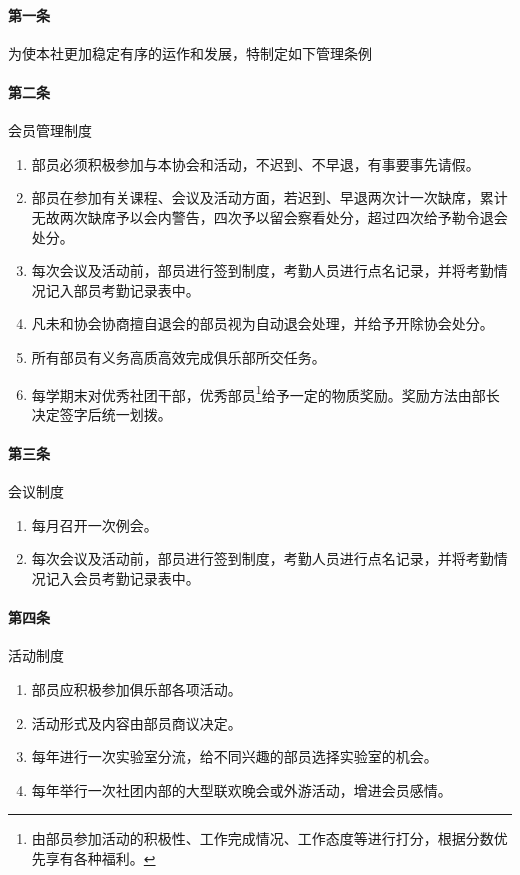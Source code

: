 \documentclass{club}
\begin{document}
\paragraph{第一条} 为使本社更加稳定有序的运作和发展，特制定如下管理条例

\paragraph{第二条} 会员管理制度
\begin{enumerate}
    \item 部员必须积极参加与本协会和活动，不迟到、不早退，有事要事先请假。
    \item 部员在参加有关课程、会议及活动方面，若迟到、早退两次计一次缺席，累计无故两次缺席予以会内警告，四次予以留会察看处分，超过四次给予勒令退会处分。
    \item 每次会议及活动前，部员进行签到制度，考勤人员进行点名记录，并将考勤情况记入部员考勤记录表中。
    \item 凡未和协会协商擅自退会的部员视为自动退会处理，并给予开除协会处分。
    \item 所有部员有义务高质高效完成俱乐部所交任务。
    \item 每学期末对优秀社团干部，优秀部员\footnote{由部员参加活动的积极性、工作完成情况、工作态度等进行打分，根据分数优先享有各种福利。}给予一定的物质奖励。奖励方法由部长决定签字后统一划拨。
\end{enumerate}

\paragraph{第三条} 会议制度
\begin{enumerate}
    \item 每月召开一次例会。
    \item 每次会议及活动前，部员进行签到制度，考勤人员进行点名记录，并将考勤情况记入会员考勤记录表中。
\end{enumerate}

\paragraph{第四条} 活动制度
\begin{enumerate}
    \item 部员应积极参加俱乐部各项活动。
    \item 活动形式及内容由部员商议决定。
    \item 每年进行一次实验室分流，给不同兴趣的部员选择实验室的机会。
    \item 每年举行一次社团内部的大型联欢晚会或外游活动，增进会员感情。
\end{enumerate}
\end{document}
